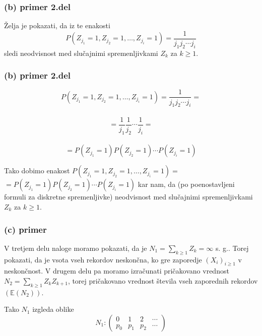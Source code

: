 \documentclass[12pt, hyperref={unicode}]{beamer}
\begin{document}
\begin{frame}

  \frametitle{(b) primer 2.del}
  Želja je pokazati, da iz te enakosti
  $$P(Z_{j_1} = 1, Z_{j_2} = 1, \dots, Z_{j_i} = 1) = \frac{1}{j_1j_2 \cdots j_i} $$
  sledi neodvisnost med slučajnimi spremenljivkami $Z_k$ za $k \geq 1$.
\end{frame}

\begin{frame}
  
  \frametitle{(b) primer 2.del}
  $$P(Z_{j_1} = 1, Z_{j_2} = 1, \dots, Z_{j_i} = 1) = \frac{1}{j_1j_2 \cdots j_i} = $$\\
  $$ = \frac{1}{j_1} \frac{1}{j_2} \cdots \frac{1}{j_i} = $$\\
  $$ = P(Z_{j_1} = 1) P(Z_{j_2} = 1) \cdots P(Z_{j_i} = 1)$$
  \vspace{5mm}

  Tako dobimo enakost $P(Z_{j_1}= 1, Z_{j_2}= 1, \dots, Z_{j_i}= 1) =$\\
  $= P(Z_{j_1}= 1) P(Z_{j_2}= 1) \cdots P(Z_{j_i}= 1)$
  kar nam, da (po poenostavljeni formuli za diskretne spremenljivke) neodvisnost med slučajnimi spremenljivkami $Z_k$ za $k \geq 1$.
  
\end{frame}

\begin{frame}
   
  \frametitle{(c) primer}
  V tretjem delu naloge moramo pokazati, da je $N_1 = \sum_{k\geq1} Z_k = \infty$ s. g..
  Torej pokazati, da je vsota vseh rekordov neskončna, ko gre zaporedje $ (X_i)_{i\geq1} $ v neskončnost.
  V drugem delu pa moramo izračunati pričakovano vrednost $N_2 = \sum_{k\geq1} Z_k Z_{k+1}$,
  torej pričakovano vrednost števila vseh
  zaporednih rekordov $(\mathbb{E}(N_2))$.
  \vspace{5mm}

  Tako $N_1$ izgleda oblike $$N_1 : \left( \begin{array}{cccc} 0 & 1 & 2 & \cdots\\
    p_0 & p_1 & p_2 & \cdots \end{array}\right)$$

\end{frame}
\end{document}
